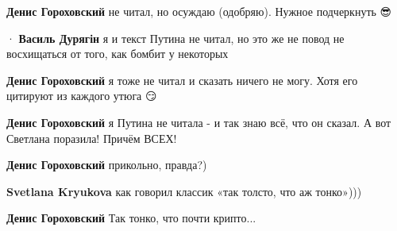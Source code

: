 \begin{itemize}
\begin{itemize}
\textbf{Денис Гороховский} не читал, но осуждаю (одобряю). Нужное подчеркнуть 😎

 
  · 
\textbf{Василь Дурягін} я и текст Путина не читал, но это же не повод не восхищаться от того, как бомбит у некоторых

 
\textbf{Денис Гороховский} я тоже не читал и сказать ничего не могу. Хотя его цитируют из каждого утюга 😏

 
\textbf{Денис Гороховский} я Путина не читала - и так знаю всё, что он сказал. А вот Светлана поразила! Причём ВСЕХ!


 
\textbf{Денис Гороховский} прикольно, правда?)

 
\textbf{Svetlana Kryukova} как говорил классик «так толсто, что аж тонко»)))

 
\textbf{Денис Гороховский} Так тонко, что почти крипто...

 

\end{itemize}
\end{itemize}
